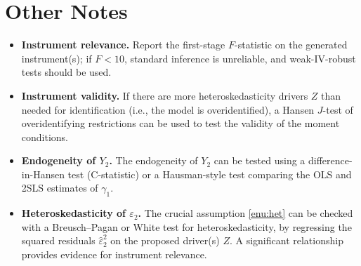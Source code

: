 \section{Other Notes}
\begin{itemize}
\itemsep2pt
\item \textbf{Instrument relevance.} Report the first-stage $F$-statistic
on the generated instrument(s); if $F<10$, standard inference is
unreliable, and weak-IV-robust tests should be used.
\item \textbf{Instrument validity.} If there are more heteroskedasticity
drivers $Z$ than needed for identification (i.e., the model is overidentified),
a Hansen $J$-test of overidentifying restrictions can be used to
test the validity of the moment conditions.
\item \textbf{Endogeneity of $Y_{2}$.} The endogeneity of $Y_{2}$ can
be tested using a difference-in-Hansen test (C-statistic) or a Hausman-style
test comparing the OLS and 2SLS estimates of $\gamma_{1}$.
\item \textbf{Heteroskedasticity of $\varepsilon_{2}$.} The crucial assumption
\ref{enu:het} can be checked with a Breusch--Pagan or White test
for heteroskedasticity, by regressing the squared residuals $\hat{\varepsilon}_{2}^{2}$
on the proposed driver(s) $Z$. A significant relationship provides
evidence for instrument relevance.
\end{itemize}

\printbibliography


